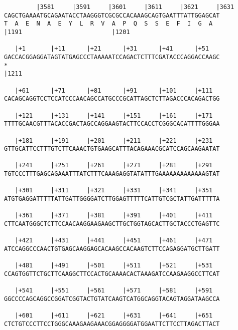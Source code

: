 \documentclass{article}
\begin{document}
\begin{Verbatim}
         |3581     |3591     |3601     |3611     |3621     |3631
CAGCTGAAAATGCAGAATACCTAAGGGTCGCGCCACAAAGCAGTGAATTTATTGGAGCAT
T  A  E  N  A  E  Y  L  R  V  A  P  Q  S  S  E  F  I  G  A  
|1191                         |1201                         
  
   |+1       |+11      |+21      |+31      |+41      |+51   
GACCACGGAGGATAGTATGAGCCCTAAAAATCCAGACTCTTTCGATACCCAGGACCAAGC
*   
|1211                                                       
  
   |+61      |+71      |+81      |+91      |+101     |+111  
CACAGCAGGTCCTCCATCCCAACAGCCATGCCCGCATTAGCTCTTAGACCCACAGACTGG
                                                            
   |+121     |+131     |+141     |+151     |+161     |+171  
TTTTGCAACGTTTACACCGACTAGCCAGGAAGTACTTCCACCTCGGGCACATTTTGGGAA
                                                            
   |+181     |+191     |+201     |+211     |+221     |+231  
GTTGCATTCCTTTGTCTTCAAACTGTGAAGCATTTACAGAAACGCATCCAGCAAGAATAT
                                                            
   |+241     |+251     |+261     |+271     |+281     |+291  
TGTCCCTTTGAGCAGAAATTTATCTTTCAAAGAGGTATATTTGAAAAAAAAAAAAAGTAT
                                                            
   |+301     |+311     |+321     |+331     |+341     |+351  
ATGTGAGGATTTTTATTGATTGGGGATCTTGGAGTTTTTCATTGTCGCTATTGATTTTTA
                                                            
   |+361     |+371     |+381     |+391     |+401     |+411  
CTTCAATGGGCTCTTCCAACAAGGAAGAAGCTTGCTGGTAGCACTTGCTACCCTGAGTTC
                                                            
   |+421     |+431     |+441     |+451     |+461     |+471  
ATCCAGGCCCAACTGTGAGCAAGGAGCACAAGCCACAAGTCTTCCAGAGGATGCTTGATT
                                                            
   |+481     |+491     |+501     |+511     |+521     |+531  
CCAGTGGTTCTGCTTCAAGGCTTCCACTGCAAAACACTAAAGATCCAAGAAGGCCTTCAT
                                                            
   |+541     |+551     |+561     |+571     |+581     |+591  
GGCCCCAGCAGGCCGGATCGGTACTGTATCAAGTCATGGCAGGTACAGTAGGATAAGCCA
                                                            
   |+601     |+611     |+621     |+631     |+641     |+651  
CTCTGTCCCTTCCTGGGCAAAGAAGAAACGGAGGGGATGGAATTCTTCCTTAGACTTACT
                                                            

\end{Verbatim}
\end{document}
